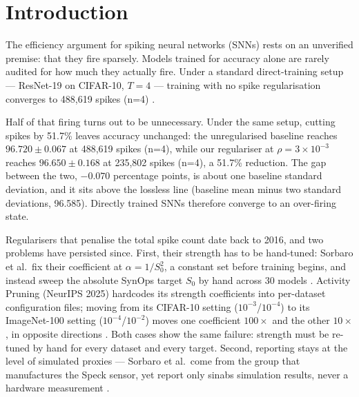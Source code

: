 \section{Introduction}
\label{sec:intro}

The efficiency argument for spiking neural networks (SNNs) rests on an unverified
premise: that they fire sparsely. Models trained for accuracy alone are rarely audited
for how much they actually fire. Under a standard direct-training setup --- ResNet-19 on
CIFAR-10, $T=4$ --- training with no spike regularisation converges to 488,619 spikes
(n=4) \cite{wu2018spatio,neftci2019surrogate,zheng2021going}.

Half of that firing turns out to be unnecessary. Under the same setup, cutting spikes by
51.7\% leaves accuracy unchanged: the unregularised baseline reaches
$96.720 \pm 0.067$ at 488,619 spikes (n=4), while our regulariser at
$\rho{=}3{\times}10^{-3}$ reaches $96.650 \pm 0.168$ at 235,802 spikes (n=4), a 51.7\%
reduction. The gap between the two, $-0.070$ percentage points, is about one baseline
standard deviation, and it sits above the lossless line (baseline mean minus two
standard deviations, 96.585). Directly trained SNNs therefore converge to an
over-firing state.

Regularisers that penalise the total spike count date back to 2016, and two problems
have persisted since. First, their strength has to be hand-tuned: Sorbaro et al.\ fix
their coefficient at $\alpha=1/S_0^2$, a constant set before training begins, and
instead sweep the absolute SynOps target $S_0$ by hand across 30 models
\cite{sorbaro2020optimizing}. Activity Pruning (NeurIPS 2025) hardcodes its strength
coefficients into per-dataset configuration files; moving from its CIFAR-10 setting
($10^{-3}$/$10^{-4}$) to its ImageNet-100 setting ($10^{-4}$/$10^{-2}$) moves one
coefficient $100\times$ and the other $10\times$, in opposite directions
\cite{bu2025activity}. Both cases show the same failure: strength must be re-tuned by
hand for every dataset and every target. Second, reporting stays at the level of
simulated proxies --- Sorbaro et al.\ come from the group that manufactures the Speck
sensor, yet report only sinabs simulation results, never a hardware measurement
\cite{neil2016learning,sorbaro2020optimizing,pellegrini2021low,meda2022improving}.

